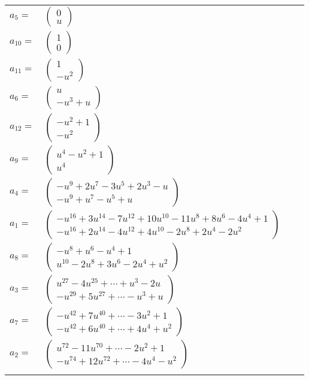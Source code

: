 \documentclass[1p]{elsarticle_modified}
\theoremstyle{definition}
\begin{document}
\begin{tabular}{m{7pt} m{180pt} m{7pt} m{180pt} }
\flushright $a_{5}=$&$\begin{pmatrix}0\\u\end{pmatrix}$ \\
\flushright $a_{10}=$&$\begin{pmatrix}1\\0\end{pmatrix}$ \\
\flushright $a_{11}=$&$\begin{pmatrix}1\\- u^2\end{pmatrix}$ \\
\flushright $a_{6}=$&$\begin{pmatrix}u\\- u^3+u\end{pmatrix}$ \\
\flushright $a_{12}=$&$\begin{pmatrix}- u^2+1\\- u^2\end{pmatrix}$ \\
\flushright $a_{9}=$&$\begin{pmatrix}u^4- u^2+1\\u^4\end{pmatrix}$ \\
\flushright $a_{4}=$&$\begin{pmatrix}- u^9+2 u^7-3 u^5+2 u^3- u\\- u^9+u^7- u^5+u\end{pmatrix}$ \\
\flushright $a_{1}=$&$\begin{pmatrix}- u^{16}+3 u^{14}-7 u^{12}+10 u^{10}-11 u^8+8 u^6-4 u^4+1\\- u^{16}+2 u^{14}-4 u^{12}+4 u^{10}-2 u^8+2 u^4-2 u^2\end{pmatrix}$ \\
\flushright $a_{8}=$&$\begin{pmatrix}- u^8+u^6- u^4+1\\u^{10}-2 u^8+3 u^6-2 u^4+u^2\end{pmatrix}$ \\
\flushright $a_{3}=$&$\begin{pmatrix}u^{27}-4 u^{25}+\cdots+u^3-2 u\\- u^{29}+5 u^{27}+\cdots- u^3+u\end{pmatrix}$ \\
\flushright $a_{7}=$&$\begin{pmatrix}- u^{42}+7 u^{40}+\cdots-3 u^2+1\\- u^{42}+6 u^{40}+\cdots+4 u^4+u^2\end{pmatrix}$ \\
\flushright $a_{2}=$&$\begin{pmatrix}u^{72}-11 u^{70}+\cdots-2 u^2+1\\- u^{74}+12 u^{72}+\cdots-4 u^4- u^2\end{pmatrix}$\\&\end{tabular}
\end{document}
